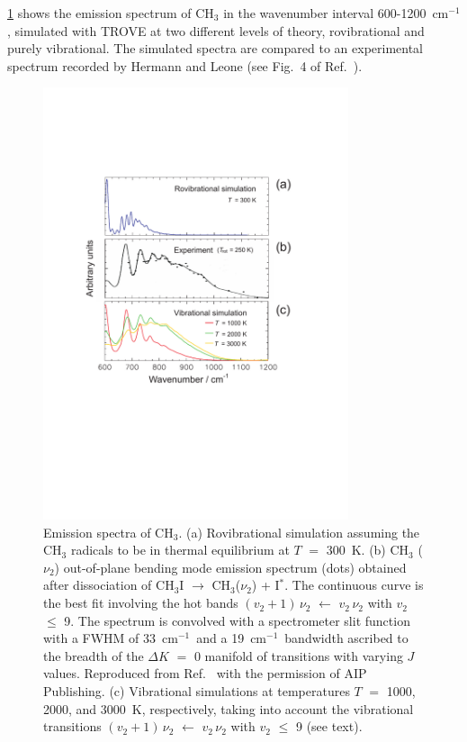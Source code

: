 \documentclass{achemso}
\newcommand{\3}{$_{3}$}
\newcommand{\cm}{cm$^{-1}$}
\begin{document}
\ref{fig:nu2} shows the emission spectrum of CH$_3$ in
the wavenumber interval 600-1200~\cm,
simulated with TROVE
at two different levels of theory,
rovibrational and purely vibrational. The simulated spectra are compared to
an experimental spectrum recorded by
Hermann and Leone\cite{nu2_82a,nu2_82b} (see Fig.~4 of Ref.~).



\begin{figure}[h]
\begin{center}
\caption{\protect\label{fig:nu2}
Emission spectra of CH\3.
(a)
Rovibrational simulation assuming the CH$_3$ radicals to be in
thermal equilibrium at
 $T$ $=$ 300~K.
(b)
CH$_3$ ($\nu_2$) out-of-plane bending mode
emission spectrum (dots) obtained\protect\cite{nu2_82a}
after
 dissociation of
CH$_3$I $\rightarrow$ CH$_3$($\nu_2$) + I$^*$.
  The continuous curve is the best fit\protect\cite{nu2_82a}
 involving the hot bands
 $(v_2+1)\, \nu_2$ $\leftarrow$
 $v_2\, \nu_2$ with
 $v_2$ $\leqslant$ 9. The spectrum is
convolved with a
 spectrometer slit function with a FWHM of
33~\cm\ and a 19~\cm\ bandwidth ascribed to the breadth of the $\Delta K$ $=$ 0 manifold of transitions with varying $J$ values.
Reproduced from
Ref.~
 with the permission of AIP Publishing.
(c)
Vibrational simulations
at temperatures $T$ $=$ 1000, 2000, and 3000~K, respectively, taking into account the vibrational
transitions
 $(v_2+1)\, \nu_2$ $\leftarrow$
 $v_2\, \nu_2$ with
 $v_2$ $\leqslant$ 9 (see text).
}
\includegraphics[width=0.8\textwidth]{CH3_LinLis_Fig1.pdf}
\end{center}
\end{figure}
\end{document}
